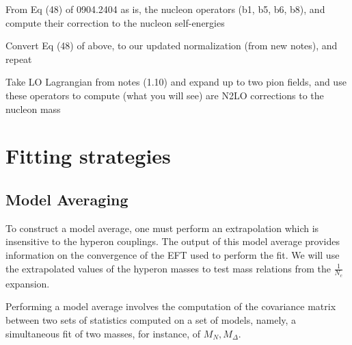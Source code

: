 \documentclass[12pt,tightenlines, raggedbottom, prd, notitlepage]{revtex4-1}
\def\mc#1{{\mathcal #1}}
\def\tr{\text{tr}}
\begin{document}
From Eq (48) of 0904.2404 as is, 
the nucleon operators (b1, b5, b6, b8), and compute their correction to the nucleon self-energies


Convert Eq (48) of above, to our updated normalization (from new notes), and repeat

Take LO Lagrangian from notes (1.10) and expand up to two pion fields, and use these operators to compute (what you will see) are N2LO corrections to the nucleon mass


\section*{Fitting strategies}

\subsection*{Model Averaging}
To construct a model average, one must perform an extrapolation which is insensitive
to the hyperon couplings. The output of this model average provides information on the 
convergence of the EFT used to perform the fit. We will use the extrapolated values of 
the hyperon masses to test mass relations from the $\frac{1}{N_c}$ expansion.

Performing a model average involves the computation of the covariance matrix between
two sets of statistics computed on a set of models, namely, a simultaneous fit of two 
masses, for instance, of $M_N , M_\Delta$. 
\end{document}
